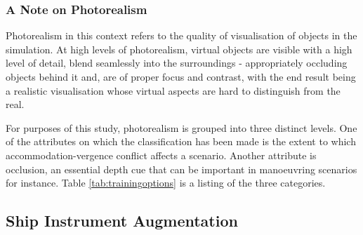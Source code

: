 \subsubsection{A Note on Photorealism}
\label{sec:photorealism}
Photorealism in this context refers to the quality of visualisation of objects in the simulation. At high levels of photorealism, virtual objects are visible with a high level of detail, blend seamlessly into the surroundings - appropriately occluding objects behind it and, are of proper focus and contrast, with the end result being a realistic visualisation whose virtual aspects are hard to distinguish from the real. 


For purposes of this study, photorealism is grouped into three distinct levels. One of the attributes on which the classification has been made is the extent to which accommodation-vergence conflict affects a scenario. Another attribute is occlusion, an essential depth cue that can be important in manoeuvring scenarios for instance. Table \ref{tab:trainingoptions} is a listing of the three categories.

\subsection{Ship Instrument Augmentation}

